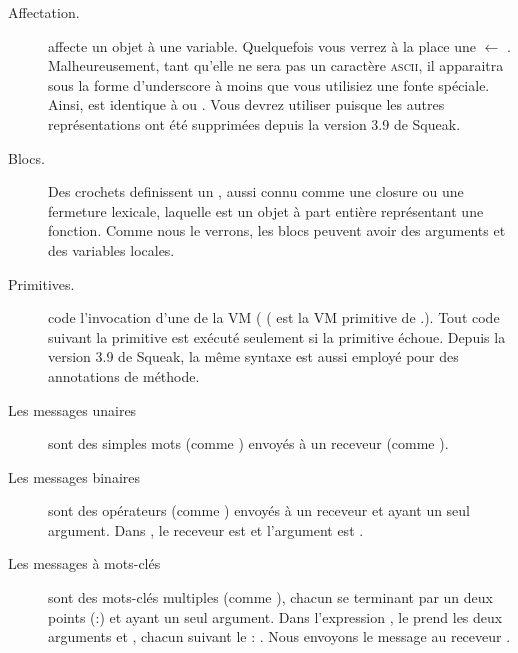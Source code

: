 \documentclass[a4paper,10pt,twoside]{book}
\begin{document}
\begin{description}
\item[Affectation.]	\ct{:=} affecte un objet \`{a} une variable.
Quelquefois vous verrez \`{a} la place une $\leftarrow$ .
Malheureusement, tant qu'elle ne sera pas un caract\`{e}re \textsc{ascii}, il apparaitra sous la forme d'underscore  \`{a} moins que vous utilisiez une fonte sp\'{e}ciale.
Ainsi,  est identique \`{a}  ou . Vous devrez utiliser  \ct{:=} puisque les autres repr\'{e}sentations ont \'{e}t\'{e} supprim\'{e}es depuis la version 3.9 de Squeak.

\item[Blocs.] Des crochets \ct{[ ]} definissent un , aussi connu comme une closure  ou une fermeture lexicale, laquelle est un objet \`{a} part enti\`{e}re repr\'{e}sentant une fonction.
Comme nous le verrons, les blocs peuvent avoir des arguments et des variables locales.

\item[Primitives.]	 code l'invocation d'une  de la VM (
( est la VM primitive de .).
Tout code suivant la primitive est ex\'{e}cut\'{e} seulement si la primitive \'{e}choue. Depuis la version 3.9 de Squeak, la m\^{e}me syntaxe est aussi employ\'{e} pour des annotations de m\'{e}thode.

\item[Les messages unaires] sont des simples mots (comme ) envoy\'{e}s \`{a} un receveur (comme ).

\item[Les messages binaires] sont des op\'{e}rateurs (comme \ct{+}) envoy\'{e}s \`{a} un receveur et ayant un seul argument. Dans , le receveur est  et l'argument est .

\item[Les messages \`{a} mots-cl\'{e}s] sont des mots-cl\'{e}s multiples (comme ), chacun se terminant par un deux points (:) et ayant un seul argument. 
Dans l'expression , le   prend les deux arguments  et , chacun suivant le : . Nous envoyons le message au receveur .


\end{description}
\end{document}
